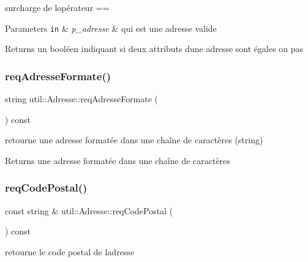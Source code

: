 surcharge de l\textquotesingle{}opérateur == 


\begin{DoxyParams}[1]{Parameters}
\mbox{\tt in}  & {\em p\+\_\+adresse} & qui est une adresse valide \\
\hline
\end{DoxyParams}
\begin{DoxyReturn}{Returns}
un booléen indiquant si deux attributs d\textquotesingle{}une adresse sont égales ou pas 
\end{DoxyReturn}
\mbox{\label{classutil_1_1Adresse_ac16f05f371142a65c6f81dea5cce1606}} 
\subsubsection{\texorpdfstring{req\+Adresse\+Formate()}{reqAdresseFormate()}}
{\footnotesize\ttfamily string util\+::\+Adresse\+::req\+Adresse\+Formate (\begin{DoxyParamCaption}{ }\end{DoxyParamCaption}) const}



retourne une adresse formatée dans une chaîne de caractères (string) 

\begin{DoxyReturn}{Returns}
une adresse formatée dans une chaîne de caractères 
\end{DoxyReturn}
\mbox{\label{classutil_1_1Adresse_ad4d1a2d82f33ac08b8a647fd479f9edc}} 
\subsubsection{\texorpdfstring{req\+Code\+Postal()}{reqCodePostal()}}
{\footnotesize\ttfamily const string \& util\+::\+Adresse\+::req\+Code\+Postal (\begin{DoxyParamCaption}{ }\end{DoxyParamCaption}) const}



retourne le code postal de l\textquotesingle{}adresse 

